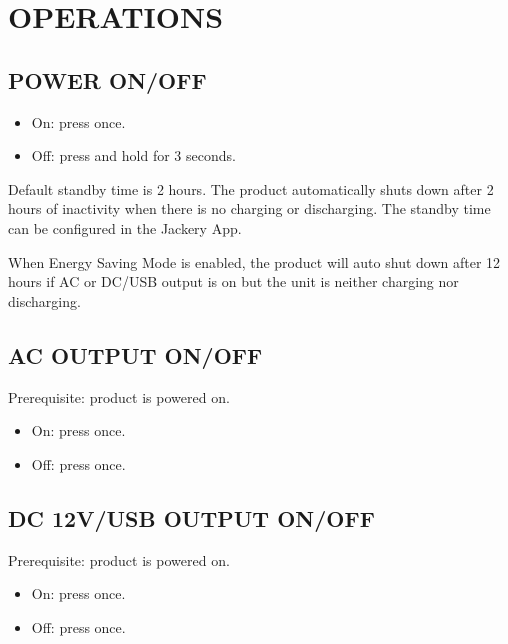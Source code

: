 \documentclass[a4paper,10pt,twoside,openany,english]{sphinxhowto}
\begin{document}


\section{OPERATIONS}
\label{\detokenize{index:operations}}

\subsection{POWER ON/OFF}
\label{\detokenize{index:power-on-off}}\begin{itemize}
\item {} 
\sphinxAtStartPar
On: press once.

\item {} 
\sphinxAtStartPar
Off: press and hold for 3 seconds.

\end{itemize}

\sphinxAtStartPar
Default standby time is 2 hours.
The product automatically shuts down after 2 hours of inactivity when there is no charging or discharging.
The standby time can be configured in the Jackery App.

\sphinxAtStartPar
When Energy Saving Mode is enabled, the product will auto shut down after 12 hours
if AC or DC/USB output is on but the unit is neither charging nor discharging.


\subsection{AC OUTPUT ON/OFF}
\label{\detokenize{index:ac-output-on-off}}
\sphinxAtStartPar
Prerequisite: product is powered on.
\begin{itemize}
\item {} 
\sphinxAtStartPar
On: press once.

\item {} 
\sphinxAtStartPar
Off: press once.

\end{itemize}


\subsection{DC 12V/USB OUTPUT ON/OFF}
\label{\detokenize{index:dc-12v-usb-output-on-off}}
\sphinxAtStartPar
Prerequisite: product is powered on.
\begin{itemize}
\item {} 
\sphinxAtStartPar
On: press once.

\item {} 
\sphinxAtStartPar
Off: press once.

\end{itemize}
\end{document}
